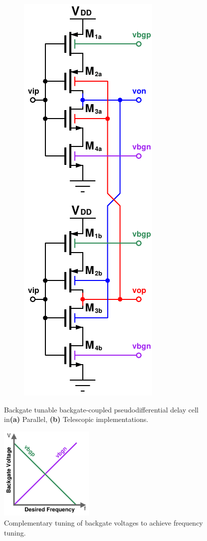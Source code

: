 \begin{figure}[htb!]
\begin{subfigure}{0.5\textwidth}
			        \includegraphics[height=0.5\textheight, angle=0]{./figs/design/tele_delay_cell2}
			        \caption{ }
			        \label{fig:telescopic_delay_cell}
			    \end{subfigure}
			    \label{fig:tunable_delay_cells}
			    \caption{Backgate tunable backgate-coupled pseudodifferential delay cell in\textbf{(a)} Parallel, \textbf{(b)} Telescopic implementations.}
			\end{figure} 

			\begin{figure}[htb!]
			    \centering
			    \includegraphics[width=0.4\textwidth, angle=0]{./figs/design/tuning}
			    \caption{Complementary tuning of backgate voltages to achieve frequency tuning.}
			    \label{fig:bg_tuning_scheme}
			\end{figure}

